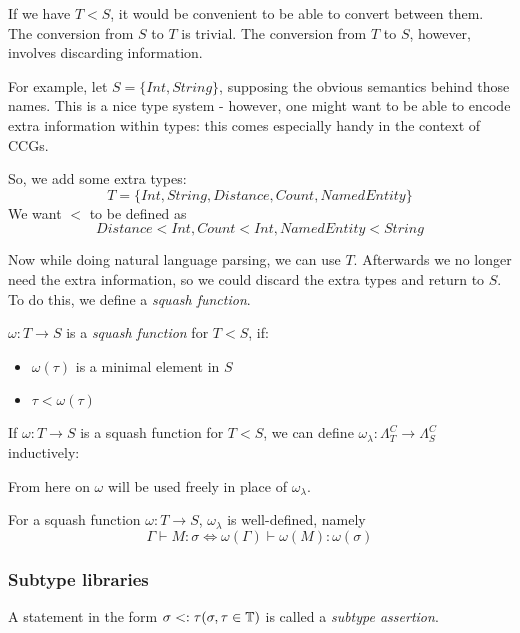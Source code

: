 \documentclass[main.tex]{subfiles}
\begin{document}
If we have $T \less S$, it would be convenient to be able to convert between them.
The conversion from $S$ to $T$ is trivial. The conversion from $T$ to $S$,
however, involves discarding information.

\begin{example}
    For example, let $S = \{ Int, String \}$, supposing the obvious semantics
    behind those names. This is a nice type system - however, one might want to
    be able to encode extra information within types: this comes especially
    handy in the context of CCGs.

    So, we add some extra types: \[ T = \{ Int, String, Distance, Count, NamedEntity \} \]
    We want $\less$ to be defined as \[ Distance \less Int, Count \less Int,
    NamedEntity \less String \]

    Now while doing natural language parsing, we can use $T$. Afterwards
    we no longer need the extra information, so we could discard the extra
    types and return to $S$. To do this, we define a \emph{squash function}.
\end{example}

\begin{defn}
    $\omega: T \rightarrow S$ is a \emph{squash function} for $T \less S$, if:
    \begin{itemize}
        \item $\omega(\tau)$ is a minimal element in $S$
        \item $\tau \less \omega(\tau)$
    \end{itemize}
\end{defn}

\begin{defn}
    If $\omega: T \rightarrow S$ is a squash function for $T \less S$, we can define
    $\omega_{\lambda}: \Lambda_T^C \rightarrow \Lambda_S^C$ inductively:
\end{defn}

From here on $\omega$ will be used freely in place of $\omega_{\lambda}$.

\begin{prop}
    For a squash function $\omega: T \rightarrow S$, $\omega_{\lambda}$ is
    well-defined, namely
    \[ \Gamma \vdash M : \sigma \iff \omega(\Gamma) \vdash \omega(M) : \omega(\sigma) \]
\end{prop}

\subsubsection{Subtype libraries}
\begin{defn}
    A statement in the form $\sigma <: \tau (\sigma, \tau \in \mathbb{T})$
    is called a \emph{subtype assertion}.
\end{defn}
\end{document}

